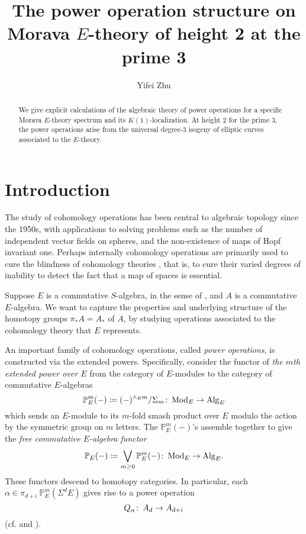 \documentclass{gtpart}
\title{The power operation structure on Morava $E$-theory of height 2 at the prime 3}
\author{Yifei Zhu}
\theoremstyle{definition}
\theoremstyle{remark}
\def\co{\colon\thinspace}
\newcommand{\mb}[1]{\mathbb{#1}}
\newcommand{\Mod}{{\rm Mod}}
\newcommand{\Alg}{{\rm Alg}}
\newcommand{\cff}[2]{cf.\thinspace{\cite[#1]{#2}}}
\newcommand{\BP}{{\mb P}}
\newcommand{\A}{\alpha}
\begin{document}
\begin{abstract}
 We give explicit calculations of the algebraic theory of power operations for a specific Morava $E$-theory spectrum and its $K(1)$-localization.  
 At height 2 for the prime 3, the power operations arise from the universal degree-3 isogeny of elliptic curves associated to the $E$-theory.  
\end{abstract}


\maketitle
\section{Introduction}
\label{sec:intro}

The study of cohomology operations has been central to algebraic topology 
since the 1950s, with applications to solving problems such as the number of independent vector fields 
on spheres, and the non-existence of maps of Hopf invariant one.  
Perhaps internally cohomology operations are primarily used to cure the blindness of cohomology theories \cite{blind}, 
that is, to cure their varied degrees of inability to detect the fact that a map of spaces is essential.  

Suppose $E$ is a commutative $S$-algebra, in the sense of \cite{EKMM}, and $A$ is a commutative $E$-algebra.  
We want to capture the properties and underlying structure of the homotopy groups $\pi_* A = A_*$ of $A$, 
by studying operations associated to the cohomology theory that $E$ represents.  

An important family of cohomology operations, called {\em power operations}, is constructed via the extended powers.  
Specifically, consider the functor of {\em the $m$th extended power over $E$} from the category of $E$-modules to the category of commutative $E$-algebras 
\[
 \BP_E^m (-) \coloneqq (-)^{\wedge_E m} / \Sigma_m \co \Mod_E \to \Alg_E 
\]
which sends an $E$-module to its $m$-fold smash product over $E$ modulo the action by the symmetric group on $m$ letters.  
The $\BP_E^m (-)$'s assemble together to give the {\em free commutative $E$-algebra functor} 
\[
 \BP_E (-) \coloneqq \bigvee_{m \geq 0} \BP_E^m (-) \co \Mod_E \to \Alg_E.  
\]
These functors descend to homotopy categories.  
In particular, each $\A \in \pi_{d+i}~\BP_E^m (\Sigma^d E)$ gives rise to a power operation 
\[
 Q_\A \co A_d \to A_{d+i} 
\]
(\cff{Sections I.2 and IX.1}{H_infty} and \cite[Section 3]{cong}).  
\end{document}
